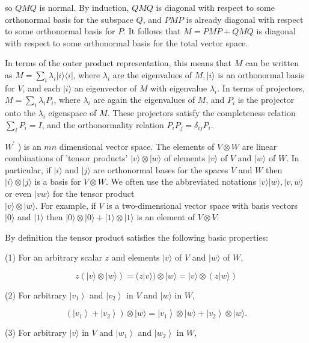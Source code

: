 so $Q M Q$ is normal. By induction, $Q M Q$ is diagonal with respect to some orthonormal basis for the subspace $Q$, and $P M P$ is already diagonal with respect to some orthonormal basis for $P$. It follows that $M=P M P+Q M Q$ is diagonal with respect to some orthonormal basis for the total vector space.

In terms of the outer product representation, this means that $M$ can be written as $M=\sum_{i} \lambda_{i}|i\rangle\langle i|$, where $\lambda_{i}$ are the eigenvalues of $M,|i\rangle$ is an orthonormal basis for $V$, and each $|i\rangle$ an eigenvector of $M$ with eigenvalue $\lambda_{i}$. In terms of projectors, $M=\sum_{i} \lambda_{i} P_{i}$, where $\lambda_{i}$ are again the eigenvalues of $M$, and $P_{i}$ is the projector onto the $\lambda_{i}$ eigenspace of $M$. These projectors satisfy the completeness relation $\sum_{i} P_{i}=I$, and the orthonormality relation $P_{i} P_{j}=\delta_{i j} P_{i}$.

$W^{\prime}$ ) is an $m n$ dimensional vector space. The elements of $V \otimes W$ are linear combinations of 'tensor products' $|v\rangle \otimes|w\rangle$ of elements $|v\rangle$ of $V$ and $|w\rangle$ of $W$. In particular, if $|i\rangle$ and $|j\rangle$ are orthonormal bases for the spaces $V$ and $W$ then $|i\rangle \otimes|j\rangle$ is a basis for $V \otimes W$. We often use the abbreviated notations $|v\rangle|w\rangle,|v, w\rangle$ or even $|v w\rangle$ for the tensor product\\
$|v\rangle \otimes|w\rangle$. For example, if $V$ is a two-dimensional vector space with basis vectors $|0\rangle$ and $|1\rangle$ then $|0\rangle \otimes|0\rangle+|1\rangle \otimes|1\rangle$ is an element of $V \otimes V$.

By definition the tensor product satisfies the following basic properties:

(1) For an arbitrary scalar $z$ and elements $|v\rangle$ of $V$ and $|w\rangle$ of $W$,

$$
z(|v\rangle \otimes|w\rangle)=(z|v\rangle) \otimes|w\rangle=|v\rangle \otimes(z|w\rangle)
$$

(2) For arbitrary $\left|v_{1}\right\rangle$ and $\left|v_{2}\right\rangle$ in $V$ and $|w\rangle$ in $W$,

$$
\left(\left|v_{1}\right\rangle+\left|v_{2}\right\rangle\right) \otimes|w\rangle=\left|v_{1}\right\rangle \otimes|w\rangle+\left|v_{2}\right\rangle \otimes|w\rangle .
$$

(3) For arbitrary $|v\rangle$ in $V$ and $\left|w_{1}\right\rangle$ and $\left|w_{2}\right\rangle$ in $W$,

